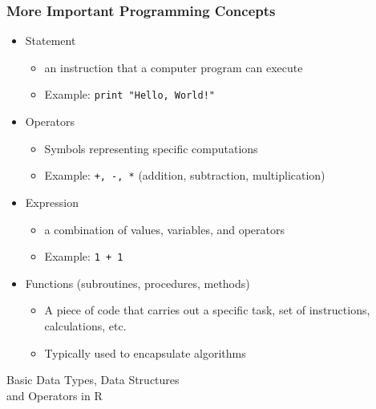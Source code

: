 \documentclass{beamer}
\begin{document}
\begin{frame}[fragile]
  \frametitle{More Important Programming Concepts}
\begin{itemize}

\item Statement
\begin{itemize}
	\item an instruction that a computer program can execute
	\item Example: \verb=print "Hello, World!"=
\end{itemize}

\item Operators
\begin{itemize}
	\item Symbols representing specific computations
	\item Example: \verb!+, -, *! (addition, subtraction, multiplication)
\end{itemize}


\item Expression
\begin{itemize}
	\item a combination of values, variables, and operators
	\item Example: \texttt{1 + 1}
\end{itemize}


\item Functions (subroutines, procedures, methods)
\begin{itemize}
	\item A piece of code that carries out a specific task, set of instructions, calculations, etc.
	\item Typically used to encapsulate algorithms
\end{itemize}

\end{itemize}

\end{frame}

\begin{frame}

\begin{center}
\LARGE{Basic Data Types, Data Structures \\ and Operators in R}

\end{center}
\end{frame}
\end{document}
